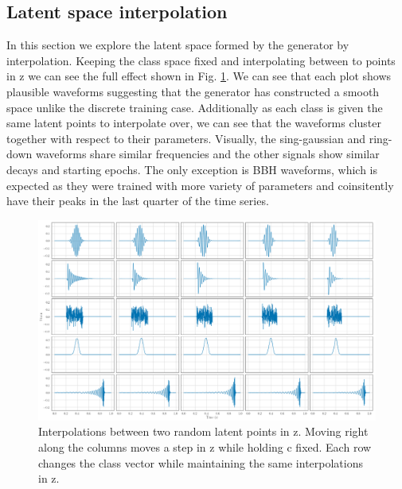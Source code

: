 \documentclass[12pt]{iopart}
\begin{document}
\subsection{Latent space interpolation}
In this section we explore the latent space formed by the generator by interpolation. Keeping the class space fixed and interpolating between to points in z we can see the full effect shown in Fig. \ref{fig:z_interp}. We can see that each plot shows plausible waveforms suggesting that the generator has constructed a smooth space unlike the discrete training case. Additionally as each class is given the same latent points to interpolate over, we can see that the waveforms cluster together with respect to their parameters. Visually, the sing-gaussian and ring-down waveforms share similar frequencies and the other signals show similar decays and starting epochs. The only exception is BBH waveforms, which is expected as they were trained with more variety of parameters and coinsitently have their peaks in the last quarter of the time series.
\begin{figure}
    \centering
    \includegraphics[width=\textwidth]{figures/fixed_class_slerp.png}
    \caption{Interpolations between two random latent points in z. Moving right along the columns moves a step in z while holding c fixed. Each row changes the class vector while maintaining the same interpolations in z.}
    \label{fig:z_interp}
\end{figure}
\end{document}
